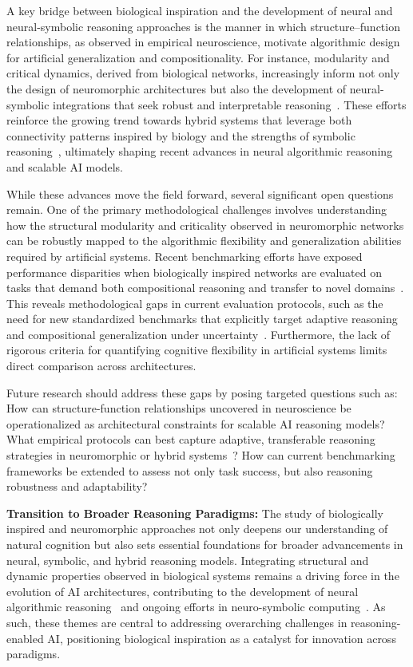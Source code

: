 \documentclass[sigconf]{acmart}
\begin{document}
A key bridge between biological inspiration and the development of neural and neural-symbolic reasoning approaches is the manner in which structure–function relationships, as observed in empirical neuroscience, motivate algorithmic design for artificial generalization and compositionality. For instance, modularity and critical dynamics, derived from biological networks, increasingly inform not only the design of neuromorphic architectures but also the development of neural-symbolic integrations that seek robust and interpretable reasoning~\cite{ref49}. These efforts reinforce the growing trend towards hybrid systems that leverage both connectivity patterns inspired by biology and the strengths of symbolic reasoning~\cite{ref49,ref86}, ultimately shaping recent advances in neural algorithmic reasoning and scalable AI models.

While these advances move the field forward, several significant open questions remain. One of the primary methodological challenges involves understanding how the structural modularity and criticality observed in neuromorphic networks can be robustly mapped to the algorithmic flexibility and generalization abilities required by artificial systems. Recent benchmarking efforts have exposed performance disparities when biologically inspired networks are evaluated on tasks that demand both compositional reasoning and transfer to novel domains~\cite{ref90}. This reveals methodological gaps in current evaluation protocols, such as the need for new standardized benchmarks that explicitly target adaptive reasoning and compositional generalization under uncertainty~\cite{ref49,ref90}. Furthermore, the lack of rigorous criteria for quantifying cognitive flexibility in artificial systems limits direct comparison across architectures.

Future research should address these gaps by posing targeted questions such as: How can structure-function relationships uncovered in neuroscience be operationalized as architectural constraints for scalable AI reasoning models? What empirical protocols can best capture adaptive, transferable reasoning strategies in neuromorphic or hybrid systems~\cite{ref49,ref90}? How can current benchmarking frameworks be extended to assess not only task success, but also reasoning robustness and adaptability?

\textbf{Transition to Broader Reasoning Paradigms:} The study of biologically inspired and neuromorphic approaches not only deepens our understanding of natural cognition but also sets essential foundations for broader advancements in neural, symbolic, and hybrid reasoning models. Integrating structural and dynamic properties observed in biological systems remains a driving force in the evolution of AI architectures, contributing to the development of neural algorithmic reasoning~\cite{ref86} and ongoing efforts in neuro-symbolic computing~\cite{ref49}. As such, these themes are central to addressing overarching challenges in reasoning-enabled AI, positioning biological inspiration as a catalyst for innovation across paradigms.
\end{document}
